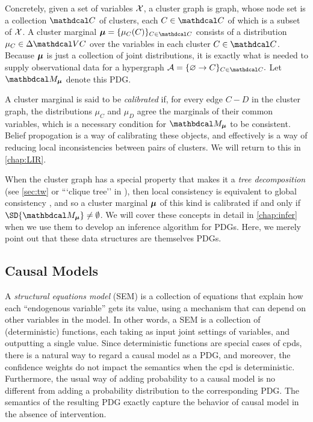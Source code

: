 Concretely, given a set of variables $\mathcal X$, a cluster graph is 
graph, whose node set is a collection $\C$ of clusters, each $C \in \C$ of which is a subset of $\mathcal X$. 
A cluster marginal $\bmu = \{ \mu_C(C) \}_{C \in \C}$ consists of a distribution $\mu_C \in \Delta \V C$ over the variables in each cluster $C \in \C$.
Because $\boldsymbol\mu$ is just a collection of joint distributions, 
it is exactly what is needed to supply observational data for a hypergraph
$
    \Ar = \{ \varnothing \to C \}_{C \in \C}.
$
Let $\dg M_{\bmu}$ denote this PDG.
 
A cluster marginal is said to be \emph{calibrated} if, for every edge $C{-}D$ in the cluster graph, the distributions $\mu_C$ and $\mu_D$ agree the marginals of their common variables, which is a necessary condition for $\dg M_{\bmu}$ to be consistent.
Belief propogation is a way of calibrating these objects, and effectively is a way of reducing local inconsistencies between pairs of clusters. We will return to this in \cref{chap:LIR}. 

When the cluster graph has a special property that makes it a \emph{tree decomposition} 
    (see \cref{sec:tw} or ```clique tree'' in \citep{KF09}),
then local consistency is equivalent to global consistency \citep{wainwright2008graphical},
and so a cluster marginal $\boldsymbol\mu$ of this kind is calibrated if and only if $\SD{\dg M_{\bmu}} \ne \emptyset$.
We will cover these concepts in detail in \cref{chap:infer} when we
    use them to develop an inference algorithm for PDGs.
Here, we merely point out that these data structures are themselves PDGs. 

\subsection{Causal Models}
    \label{ssec:capture-causal-models}
    
A \emph{structural equations model} (SEM) \citep{pearl2009causality} is a collection of equations that explain how each ``endogenous variable'' gets its value, using a mechanism that can depend on other variables in the model.
In other words, a SEM is a collection of (deterministic) functions, each taking as input joint settings of variables, and outputting a single value.
Since deterministic functions are special cases of cpds, there is a natural way to regard a causal model as a PDG, and moreover, the confidence weights do not impact the semantics when the cpd is deterministic.  
Furthermore, the usual way of adding probability to a causal model is no different from adding a probability distribution to the corresponding PDG. 
The semantics of the resulting PDG exactly capture the behavior of causal model in the absence of intervention.

